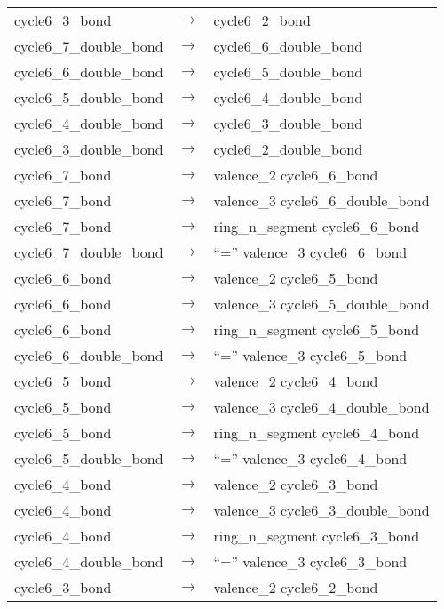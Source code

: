 \begin{longtable}{m{} p{} p{}}
    cycle6\_3\_bond & $\rightarrow$ & cycle6\_2\_bond \\
    cycle6\_7\_double\_bond & $\rightarrow$ & cycle6\_6\_double\_bond \\
    cycle6\_6\_double\_bond & $\rightarrow$ & cycle6\_5\_double\_bond \\
    cycle6\_5\_double\_bond & $\rightarrow$ & cycle6\_4\_double\_bond \\
    cycle6\_4\_double\_bond & $\rightarrow$ & cycle6\_3\_double\_bond \\
    cycle6\_3\_double\_bond & $\rightarrow$ & cycle6\_2\_double\_bond \\
    cycle6\_7\_bond & $\rightarrow$ & valence\_2 cycle6\_6\_bond \\
    cycle6\_7\_bond & $\rightarrow$ & valence\_3 cycle6\_6\_double\_bond \\
    cycle6\_7\_bond & $\rightarrow$ & ring\_n\_segment cycle6\_6\_bond \\
    cycle6\_7\_double\_bond & $\rightarrow$ & ``='' valence\_3 cycle6\_6\_bond \\
    cycle6\_6\_bond & $\rightarrow$ & valence\_2 cycle6\_5\_bond \\
    cycle6\_6\_bond & $\rightarrow$ & valence\_3 cycle6\_5\_double\_bond \\
    cycle6\_6\_bond & $\rightarrow$ & ring\_n\_segment cycle6\_5\_bond \\
    cycle6\_6\_double\_bond & $\rightarrow$ & ``='' valence\_3 cycle6\_5\_bond \\
    cycle6\_5\_bond & $\rightarrow$ & valence\_2 cycle6\_4\_bond \\
    cycle6\_5\_bond & $\rightarrow$ & valence\_3 cycle6\_4\_double\_bond \\
    cycle6\_5\_bond & $\rightarrow$ & ring\_n\_segment cycle6\_4\_bond \\
    cycle6\_5\_double\_bond & $\rightarrow$ & ``='' valence\_3 cycle6\_4\_bond \\
    cycle6\_4\_bond & $\rightarrow$ & valence\_2 cycle6\_3\_bond \\
    cycle6\_4\_bond & $\rightarrow$ & valence\_3 cycle6\_3\_double\_bond \\
    cycle6\_4\_bond & $\rightarrow$ & ring\_n\_segment cycle6\_3\_bond \\
    cycle6\_4\_double\_bond & $\rightarrow$ & ``='' valence\_3 cycle6\_3\_bond \\
    cycle6\_3\_bond & $\rightarrow$ & valence\_2 cycle6\_2\_bond \\

\end{longtable}
